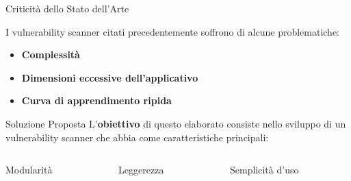 
\begin{frame}{Criticità dello Stato dell'Arte}

I vulnerability scanner citati precedentemente soffrono di alcune problematiche:
\begin{itemize}
    \item \textbf{Complessità}
    \item \textbf{Dimensioni eccessive dell'applicativo}
    \item \textbf{Curva di apprendimento ripida}
\end{itemize}


\end{frame}


\begin{frame}{Soluzione Proposta}
    L'\textbf{obiettivo} di questo elaborato consiste nello sviluppo di un vulnerability scanner che abbia come caratteristiche principali:
    \vspace{0.6cm}
    \begin{columns} 
    \begin{column}{0.3\textwidth}
    \begin{block}{Modularità}
    \end{block}
    \end{column}
    \begin{column}{0.3\textwidth}
    \begin{block}{Leggerezza}
    \end{block}
    \end{column}
    \begin{column}{0.3\textwidth}
    \begin{block}{Semplicità d'uso}
    \end{block}
    \end{column}
    \end{columns}
\end{frame}